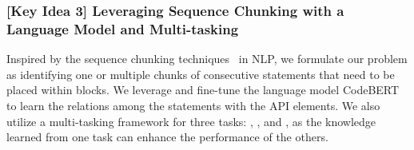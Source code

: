 
\subsubsection{[Key Idea 3] Leveraging Sequence Chunking with a Language Model and Multi-tasking} 
Inspired by the sequence chunking
techniques~\cite{sequence-chunking-aaai17} in NLP, we formulate our
problem as identifying one or multiple chunks of consecutive
statements that need to be placed within  blocks. We
leverage and fine-tune the language model
CodeBERT~\cite{codebert-emnlp20} to learn the relations among the
statements with the API elements. We also utilize a multi-tasking
framework for three tasks: {\xblock}, {\xstate}, and {\xtype}, as the
knowledge learned from one task can enhance the performance of the others.




